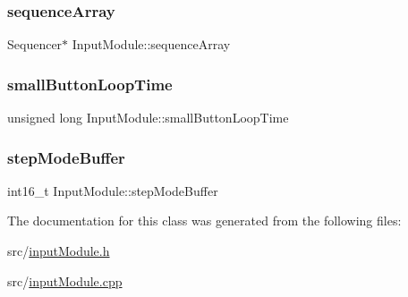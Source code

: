 \subsubsection{\texorpdfstring{sequence\+Array}{sequenceArray}}
{\footnotesize\ttfamily Sequencer$\ast$ Input\+Module\+::sequence\+Array\hspace{0.3cm}{\ttfamily [private]}}

\mbox{\label{class_input_module_ad8ba561dc4d0372e46a5b8a0e0eb82d9}} 
\subsubsection{\texorpdfstring{small\+Button\+Loop\+Time}{smallButtonLoopTime}}
{\footnotesize\ttfamily unsigned long Input\+Module\+::small\+Button\+Loop\+Time}

\mbox{\label{class_input_module_a0197f1734ab95dd812a7747c9c2374b5}} 
\subsubsection{\texorpdfstring{step\+Mode\+Buffer}{stepModeBuffer}}
{\footnotesize\ttfamily int16\+\_\+t Input\+Module\+::step\+Mode\+Buffer}



The documentation for this class was generated from the following files\+:\begin{DoxyCompactItemize}
\item 
src/\hyperlink{input_module_8h}{input\+Module.\+h}\item 
src/\hyperlink{input_module_8cpp}{input\+Module.\+cpp}\end{DoxyCompactItemize}
